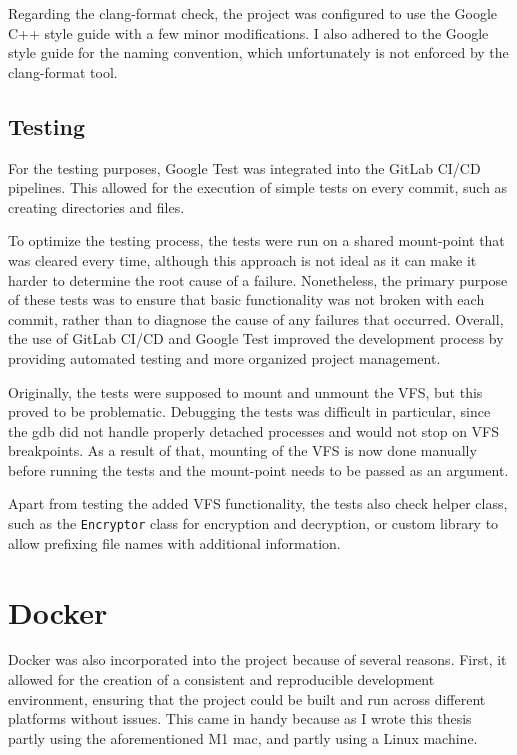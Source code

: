 Regarding the clang-format check, the project was configured to use the Google C++ style guide\cite{google_cpp_style_guide} with a few minor modifications.
I also adhered to the Google style guide for the naming convention, which unfortunately is not enforced by the clang-format tool.

\subsection{Testing}\label{subsec:testing}

For the testing purposes, Google Test was integrated into the GitLab CI/CD pipelines.
This allowed for the execution of simple tests on every commit, such as creating directories and files.

To optimize the testing process, the tests were run on a shared mount-point that was cleared every time, although this approach is not ideal as it can make it harder to determine the root cause of a failure.
Nonetheless, the primary purpose of these tests was to ensure that basic functionality was not broken with each commit, rather than to diagnose the cause of any failures that occurred.
Overall, the use of GitLab CI/CD and Google Test improved the development process by providing automated testing and more organized project management.

Originally, the tests were supposed to mount and unmount the VFS, but this proved to be problematic.
Debugging the tests was difficult in particular, since the gdb did not handle properly detached processes and would not stop on VFS breakpoints.
As a result of that, mounting of the VFS is now done manually before running the tests and the mount-point needs to be passed as an argument.

Apart from testing the added VFS functionality, the tests also check helper class, such as the \texttt{Encryptor} class for encryption and decryption, or custom library to allow prefixing file names with additional information.


\section{Docker}\label{sec:docker}

Docker\cite{docker} was also incorporated into the project because of several reasons.
First, it allowed for the creation of a consistent and reproducible development environment, ensuring that the project could be built and run across different platforms without issues.
This came in handy because as I wrote this thesis partly using the aforementioned M1 mac, and partly using a Linux machine.

